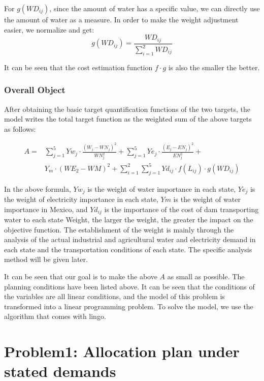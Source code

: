 \documentclass{mcmthesis}
\begin{document}
For $g(WD_{ij})$, since the amount of water has a specific value, we can directly use the amount of water as a measure. In order to make the weight adjustment easier, we normalize and get:
\begin{equation}
	g(WD_{ij})=\frac{WD_{ij}}{\sum_{i=1}^{2}WD_{ij}}
\end{equation}

It can be seen that the cost estimation function $f\cdot g$ is also the smaller the better.
\subsubsection{Overall Object}
After obtaining the basic target quantification functions of the two targets, the model writes the total target function as the weighted sum of the above targets as follows:

\begin{equation}
	\begin{aligned}	
		A=&\sum_{j=1}^{5}Yw_j\cdot \frac{(W_j-WN_{j})^2}{WN_{j}^2}+\sum_{j=1}^{5}Ye_j\cdot \frac{(E_j-EN_{j})^2}{EN_{j}^2}+\\
		&Y_m\cdot (WE_2-WM)^2+\sum_{i=1}^{2}\sum_{j=1}^{5}Yd_{ij}\cdot f(L_{ij})\cdot g(WD_{ij})
	\end{aligned}
\end{equation}

In the above formula, $Yw_j$ is the weight of water importance in each state, $Ye_j$ is the weight of electricity importance in each state, $Ym$ is the weight of water importance in Mexico, and $Yd_{ij}$ is the importance of the cost of dam transporting water to each state Weight, the larger the weight, the greater the impact on the objective function. The establishment of the weight is mainly through the analysis of the actual industrial and agricultural water and electricity demand in each state and the transportation conditions of each state. The specific analysis method will be given later.

It can be seen that our goal is to make the above $A$ as small as possible. The planning conditions have been listed above. It can be seen that the conditions of the variables are all linear conditions, and the model of this problem is transformed into a linear programming problem. To solve the model, we use the algorithm that comes with lingo.

\section{Problem1: Allocation plan under stated demands}
\end{document}
